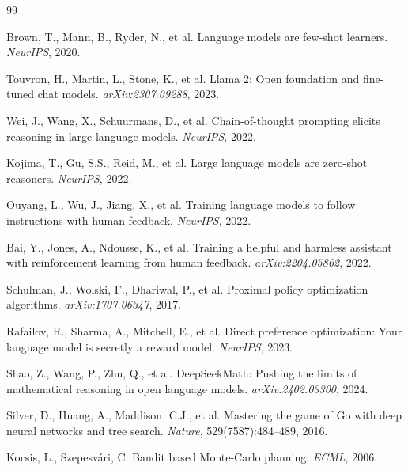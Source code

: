 \documentclass[11pt,a4paper]{article}
\begin{document}

\begin{thebibliography}{99}

Brown, T., Mann, B., Ryder, N., et al.
\newblock Language models are few-shot learners.
\newblock \emph{NeurIPS}, 2020.

Touvron, H., Martin, L., Stone, K., et al.
\newblock Llama 2: Open foundation and fine-tuned chat models.
\newblock \emph{arXiv:2307.09288}, 2023.

Wei, J., Wang, X., Schuurmans, D., et al.
\newblock Chain-of-thought prompting elicits reasoning in large language models.
\newblock \emph{NeurIPS}, 2022.

Kojima, T., Gu, S.S., Reid, M., et al.
\newblock Large language models are zero-shot reasoners.
\newblock \emph{NeurIPS}, 2022.

Ouyang, L., Wu, J., Jiang, X., et al.
\newblock Training language models to follow instructions with human feedback.
\newblock \emph{NeurIPS}, 2022.

Bai, Y., Jones, A., Ndousse, K., et al.
\newblock Training a helpful and harmless assistant with reinforcement learning from human feedback.
\newblock \emph{arXiv:2204.05862}, 2022.

Schulman, J., Wolski, F., Dhariwal, P., et al.
\newblock Proximal policy optimization algorithms.
\newblock \emph{arXiv:1707.06347}, 2017.

Rafailov, R., Sharma, A., Mitchell, E., et al.
\newblock Direct preference optimization: Your language model is secretly a reward model.
\newblock \emph{NeurIPS}, 2023.

Shao, Z., Wang, P., Zhu, Q., et al.
\newblock DeepSeekMath: Pushing the limits of mathematical reasoning in open language models.
\newblock \emph{arXiv:2402.03300}, 2024.

Silver, D., Huang, A., Maddison, C.J., et al.
\newblock Mastering the game of Go with deep neural networks and tree search.
\newblock \emph{Nature}, 529(7587):484--489, 2016.

Kocsis, L., Szepesvári, C.
\newblock Bandit based Monte-Carlo planning.
\newblock \emph{ECML}, 2006.


\end{thebibliography}
\end{document}

